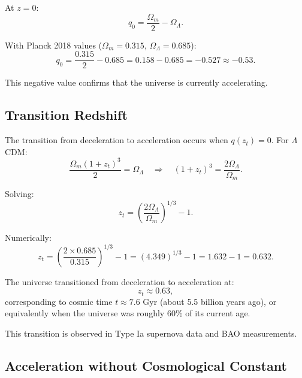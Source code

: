 \documentclass[11pt,a4paper]{article}
\newcommand{\OmegaLam}{\ensuremath{\Omega_\Lambda}}
\newcommand{\OmegaM}{\ensuremath{\Omega_m}}
\theoremstyle{definition}
\theoremstyle{remark}
\begin{document}
At $z = 0$:
\begin{equation}
q_0 = \frac{\OmegaM}{2} - \OmegaLam.
\end{equation}

With Planck 2018 values ($\OmegaM = 0.315$, $\OmegaLam = 0.685$):
\begin{equation}
\boxed{q_0 = \frac{0.315}{2} - 0.685 = 0.158 - 0.685 = -0.527 \approx -0.53.}
\end{equation}

This negative value confirms that the universe is currently accelerating.

\subsection{Transition Redshift}
\label{sec:transition}

The transition from deceleration to acceleration occurs when $q(z_t) = 0$. For $\Lambda$CDM:
\begin{equation}
\frac{\OmegaM(1+z_t)^3}{2} = \OmegaLam \quad \Rightarrow \quad (1+z_t)^3 = \frac{2\OmegaLam}{\OmegaM}.
\end{equation}

Solving:
\begin{equation}
z_t = \left(\frac{2\OmegaLam}{\OmegaM}\right)^{1/3} - 1.
\end{equation}

Numerically:
\begin{equation}
z_t = \left(\frac{2 \times 0.685}{0.315}\right)^{1/3} - 1 = (4.349)^{1/3} - 1 = 1.632 - 1 = 0.632.
\end{equation}

\begin{result}
\label{result:transition_redshift}
The universe transitioned from deceleration to acceleration at:
\begin{equation}
\boxed{z_t \approx 0.63,}
\end{equation}
corresponding to cosmic time $t \approx 7.6$ Gyr (about 5.5 billion years ago), or equivalently when the universe was roughly 60\% of its current age.
\end{result}

This transition is observed in Type Ia supernova data and BAO measurements.

\subsection{Acceleration without Cosmological Constant}
\label{sec:acceleration_no_lambda}
\end{document}
